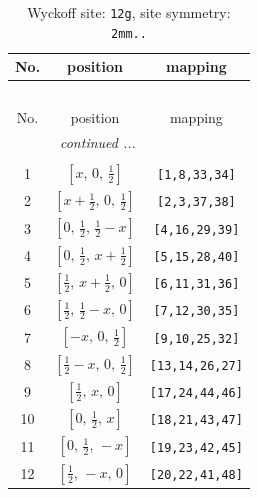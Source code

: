 \documentclass[fleqn,8pt]{jsarticle}
\begin{document}
\begin{longtable}{ccc}
\caption{Wyckoff site: {\tt 12g}, site symmetry: {\tt 2mm..}}
 \\
 \hline \hline
No. & position & mapping \\ \hline \endfirsthead

\multicolumn{2}{l}{\tablename\ \thetable{}} \\
 \hline \hline
No. & position & mapping \\ \hline \endhead

 \hline \hline
\multicolumn{2}{r}{\footnotesize\it continued ...} \\ \endfoot

 \hline \hline
\multicolumn{2}{r}{} \\ \endlastfoot

1 & $\left[ x,\, 0,\, \frac{1}{2} \right]$ & {\tt [1,8,33,34]} \\ \hline
2 & $\left[ x + \frac{1}{2},\, 0,\, \frac{1}{2} \right]$ & {\tt [2,3,37,38]} \\ \hline
3 & $\left[ 0,\, \frac{1}{2},\, \frac{1}{2} - x \right]$ & {\tt [4,16,29,39]} \\ \hline
4 & $\left[ 0,\, \frac{1}{2},\, x + \frac{1}{2} \right]$ & {\tt [5,15,28,40]} \\ \hline
5 & $\left[ \frac{1}{2},\, x + \frac{1}{2},\, 0 \right]$ & {\tt [6,11,31,36]} \\ \hline
6 & $\left[ \frac{1}{2},\, \frac{1}{2} - x,\, 0 \right]$ & {\tt [7,12,30,35]} \\ \hline
7 & $\left[ - x,\, 0,\, \frac{1}{2} \right]$ & {\tt [9,10,25,32]} \\ \hline
8 & $\left[ \frac{1}{2} - x,\, 0,\, \frac{1}{2} \right]$ & {\tt [13,14,26,27]} \\ \hline
9 & $\left[ \frac{1}{2},\, x,\, 0 \right]$ & {\tt [17,24,44,46]} \\ \hline
10 & $\left[ 0,\, \frac{1}{2},\, x \right]$ & {\tt [18,21,43,47]} \\ \hline
11 & $\left[ 0,\, \frac{1}{2},\, - x \right]$ & {\tt [19,23,42,45]} \\ \hline
12 & $\left[ \frac{1}{2},\, - x,\, 0 \right]$ & {\tt [20,22,41,48]} \\
\end{longtable}
\renewcommand{\arraystretch}{1.2}
\end{document}
